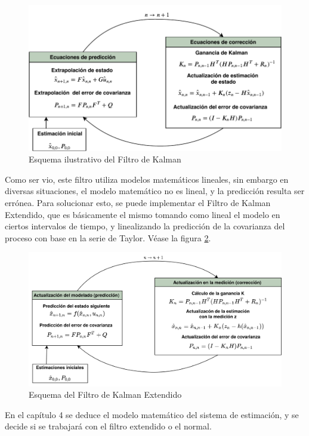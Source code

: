 \begin{figure}
\centering
\includegraphics[scale=0.7]{images/kalman_algorithm.pdf}
\caption{Esquema ilustrativo del Filtro de Kalman}
\label{fig:Kalman_scheme}
\end{figure}

	Como ser vio, este filtro utiliza modelos matemáticos lineales, sin embargo en diversas situaciones, el modelo matemático no es lineal, y la predicción resulta ser errónea. Para solucionar esto, se puede implementar el Filtro de Kalman Extendido, que es básicamente el mismo tomando como lineal el modelo en ciertos intervalos de tiempo, y linealizando la predicción de la covarianza del proceso con base en la serie de Taylor. Véase la figura \ref{fig:extended_kalman_scheme}.

\begin{figure}
\centering
\includegraphics[scale=0.05]{images/extended_kalman_algorithm.png}
\caption{Esquema del Filtro de Kalman Extendido}
\label{fig:extended_kalman_scheme}
\end{figure}

En el capítulo 4 se deduce el modelo matemático del sistema de estimación, y se decide si se trabajará con el filtro extendido o el normal. 
